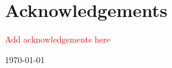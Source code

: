 \chapter*{Acknowledgements}

\textcolor{red}{Add acknowledgements here}

\vfill
{\sc \AuthorName \hfill\today}